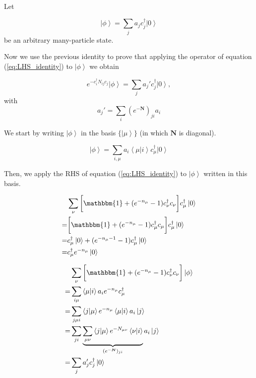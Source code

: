 Let

\begin{equation}
\left| \phi \right\rangle = \sum_j a_j c_j^\dagger \left| 0 \right\rangle
\end{equation}
be an arbitrary many-particle state. 

Now we use the previous identity to prove that applying the operator of equation (\ref{eq:LHS_identity}) to $\left| \phi \right\rangle$ we obtain

\begin{equation}
e^{-c_i^\dagger N_{ij} c_j} \left| \phi \right\rangle = \sum_j a_j' c_j^\dagger \left| 0 \right\rangle , 
\end{equation}
with
\begin{equation}
a_j' = \sum_{i} (e^{-\bm N})_{ji} a_i
\end{equation}

We start by writing $\left| \phi \right\rangle$ in the basis $\{ \left| \mu \right\rangle \}$ (in which $\bm N$ is diagonal).

\begin{equation}
\left| \phi \right\rangle = \sum_{i,\mu} a_i \left\langle \mu | i \right\rangle c_\mu^\dagger \left| 0 \right\rangle
\end{equation}

Then, we apply the RHS of equation (\ref{eq:LHS_identity}) to $\left| \phi \right\rangle$ written in this basis.

\begin{equation}\label{eq:proofAuxIdentity}
\begin{split}
&\sum_\nu \bigg[ \mathbbm{1} + ( e^{-n_\mu} - 1 ) c_\nu^\dagger c_\nu \bigg] c_\mu^\dagger \left| 0 \right\rangle \\
=&\bigg[ \mathbbm{1} + ( e^{-n_\mu} - 1 ) c_\mu^\dagger c_\mu \bigg] c_\mu^\dagger \left| 0 \right\rangle \\
=& c_\mu^\dagger \left| 0 \right\rangle + (e^{-n_\mu - 1} - 1) c_\mu^\dagger \left| 0 \right\rangle \\
=& c_\mu^\dagger e^{-n_\mu} \left| 0 \right\rangle
\end{split}
\end{equation}

\begin{equation}
\begin{split}
&\sum_\nu \bigg[ \mathbbm{1} + ( e^{-n_\mu} - 1 ) c_\nu^\dagger c_\nu \bigg] \left| \phi \right\rangle \\
=& \sum_{i\mu} \left\langle \mu | i \right\rangle a_i e^{-n_\mu} c_\mu^\dagger \\
=& \sum_{j\mu i} \left\langle j | \mu \right\rangle e^{-n_\mu} \left\langle \mu | i \right\rangle a_i \left| j \right\rangle \\
=& \sum_{j i} \underbrace{\sum_{\mu\nu} \left\langle j | \mu \right\rangle e^{-N_{\mu\nu}} \left\langle \nu | i \right\rangle}_{(e^{-\bm N})_{ji}} a_i \left| j \right\rangle \\
=& \sum_j a_j' c_j^\dagger \left| 0 \right\rangle
\end{split}
\end{equation}

